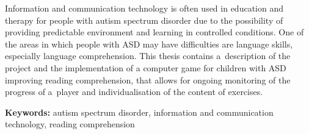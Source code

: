 Information and communication technology is often used in education and therapy for people with autism spectrum disorder due to the possibility of providing predictable environment and learning in controlled conditions.
One of the areas in which people with ASD may have difficulties are language skills, especially language comprehension.
This thesis contains a~description of the project and the implementation of a computer game for children with ASD improving reading comprehension, that allows for ongoing monitoring of the progress of a~player and individualisation of the content of exercises.

\vspace{1cm}
\noindent\textbf{Keywords:}
autism spectrum disorder, information and communication technology, reading comprehension